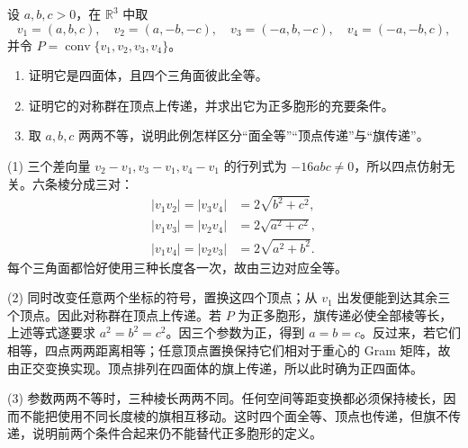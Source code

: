 \begin{exercise}
	\label{g1:ex:congruent-faces-not-regular}
	设 \(a,b,c>0\)，在 \(\mathbb R^3\) 中取
	\[
		v_1=(a,b,c),\quad v_2=(a,-b,-c),\quad
		v_3=(-a,b,-c),\quad v_4=(-a,-b,c),
	\]
	并令 \(P=\operatorname{conv}\{v_1,v_2,v_3,v_4\}\)。
	\begin{enumerate}
		\item 证明它是四面体，且四个三角面彼此全等。
		\item 证明它的对称群在顶点上传递，并求出它为正多胞形的充要条件。
		\item 取 \(a,b,c\) 两两不等，说明此例怎样区分“面全等”“顶点传递”与“旗传递”。
	\end{enumerate}
\end{exercise}
\begin{solution}
	(1) 三个差向量 \(v_2-v_1,v_3-v_1,v_4-v_1\) 的行列式为 \(-16abc\ne0\)，所以四点仿射无关。六条棱分成三对：
	\begin{align*}
		|v_1v_2|=|v_3v_4|&=2\sqrt{b^2+c^2},\\
		|v_1v_3|=|v_2v_4|&=2\sqrt{a^2+c^2},\\
		|v_1v_4|=|v_2v_3|&=2\sqrt{a^2+b^2}.
	\end{align*}
	每个三角面都恰好使用三种长度各一次，故由三边对应全等。

	(2) 同时改变任意两个坐标的符号，置换这四个顶点；从 \(v_1\) 出发便能到达其余三个顶点。因此对称群在顶点上传递。若 \(P\) 为正多胞形，旗传递必使全部棱等长，上述等式遂要求 \(a^2=b^2=c^2\)。因三个参数为正，得到 \(a=b=c\)。反过来，若它们相等，四点两两距离相等；任意顶点置换保持它们相对于重心的 Gram 矩阵，故由正交变换实现。顶点排列在四面体的旗上传递，所以此时确为正四面体。

	(3) 参数两两不等时，三种棱长两两不同。任何空间等距变换都必须保持棱长，因而不能把使用不同长度棱的旗相互移动。这时四个面全等、顶点也传递，但旗不传递，说明前两个条件合起来仍不能替代正多胞形的定义。
\end{solution}

